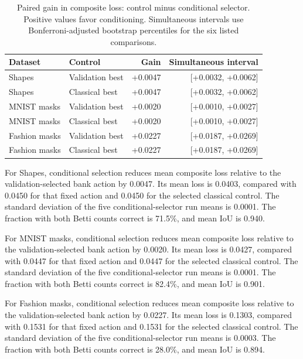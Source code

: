 \begin{table}[htbp]\centering\small

\caption{Paired gain in composite loss: control minus conditional selector. Positive values favor conditioning. Simultaneous intervals use Bonferroni-adjusted bootstrap percentiles for the six listed comparisons.}\label{tab:paired}

\begin{tabular}{llrr} \toprule Dataset & Control & Gain & Simultaneous interval\\\midrule

Shapes & Validation best & +0.0047 & [+0.0032, +0.0062]\\

Shapes & Classical best & +0.0047 & [+0.0032, +0.0062]\\

MNIST masks & Validation best & +0.0020 & [+0.0010, +0.0027]\\

MNIST masks & Classical best & +0.0020 & [+0.0010, +0.0027]\\

Fashion masks & Validation best & +0.0227 & [+0.0187, +0.0269]\\

Fashion masks & Classical best & +0.0227 & [+0.0187, +0.0269]\\

\bottomrule\end{tabular}\end{table}

For Shapes, conditional selection reduces mean composite loss relative to the validation-selected bank action by 0.0047. Its mean loss is 0.0403, compared with 0.0450 for that fixed action and 0.0450 for the selected classical control. The standard deviation of the five conditional-selector run means is 0.0001. The fraction with both Betti counts correct is 71.5\%, and mean IoU is 0.940.

For MNIST masks, conditional selection reduces mean composite loss relative to the validation-selected bank action by 0.0020. Its mean loss is 0.0427, compared with 0.0447 for that fixed action and 0.0447 for the selected classical control. The standard deviation of the five conditional-selector run means is 0.0001. The fraction with both Betti counts correct is 82.4\%, and mean IoU is 0.901.

For Fashion masks, conditional selection reduces mean composite loss relative to the validation-selected bank action by 0.0227. Its mean loss is 0.1303, compared with 0.1531 for that fixed action and 0.1531 for the selected classical control. The standard deviation of the five conditional-selector run means is 0.0003. The fraction with both Betti counts correct is 28.0\%, and mean IoU is 0.894.

